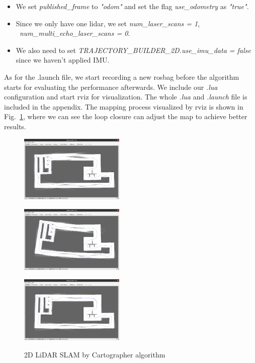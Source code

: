 \documentclass[hyperref]{article}
\theoremstyle{nonumberplain}
\begin{document}
\begin{itemize}[itemsep=3pt,topsep=0pt,parsep=0pt]
	\item We set \textit{published\_frame} to \textit{"odom"} and set the flag \textit{use\_odometry} as \textit{"true"}.
	\item Since we only have one lidar, we set \textit{num\_laser\_scans = 1}, \textit{\ num\_multi\_echo\_laser\_scans = 0}.
	\item We also need to set \textit{TRAJECTORY\_BUILDER\_2D.use\_imu\_data = false} since we haven't applied IMU.
\end{itemize}

As for the .launch file, we start recording a new rosbag before the algorithm starts for evaluating the performance afterwards. We include our \textit{.lua} configuration and start rviz for visualization. The whole \textit{.lua} and \textit{.launch} file is included in the appendix. The mapping process visualized by rviz is shown in Fig.~\ref{fig5}, where we can see the loop closure can adjust the map to achieve better results.


\begin{figure}[H]
	\centering
	\begin{minipage}[t]{0.32\textwidth}
		\centering
		\includegraphics[width=5cm]{task3a_result1.png}
		\label{fig5a}
	\end{minipage}
	\begin{minipage}[t]{0.32\textwidth}
		\centering
		\includegraphics[width=5cm]{task3a_result2.png}
		\label{fig5b}
	\end{minipage}
	\begin{minipage}[t]{0.32\textwidth}
		\centering
		\includegraphics[width=5cm]{task3a_result3.png}
		\label{fig5c}
	\end{minipage}
	\caption{2D LiDAR SLAM by Cartographer algorithm}
	\label{fig5}
\end{figure} 
\end{document}
